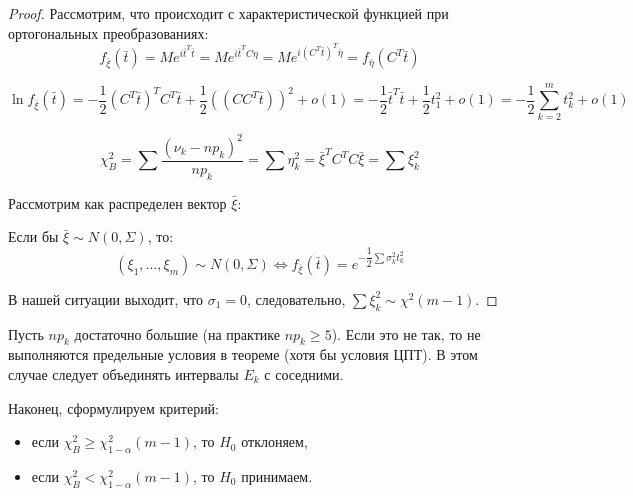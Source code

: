 \begin{proof}
  Рассмотрим, что происходит с характеристической функцией при ортогональных преобразованиях:
  \[
    f_{\bar \xi} (\bar t) = M e^{i \bar t^T \bar t} = M e^{i \bar t^T C \eta} =
    M e^{i (C^T \bar t)^T \bar \eta} = f_{\bar \eta} (C^T \bar t)
  \]

  \[
    \ln f_{\bar \xi} (\bar t) = - \dfrac{1}{2} (C^T \bar t)^T C^T \bar t + \dfrac{1}{2} ((C C^T \bar t))^2 + o(1) = -\dfrac{1}{2} \bar t^T \bar t + \dfrac{1}{2} t_1^2 + o(1) = - \dfrac{1}{2} \sum_{k=2}^m t_k^2 + o(1)
  \]

  \[
    \chi^2_B = \sum \dfrac{(\nu_k - np_k)^2}{np_k} = \sum \eta_k^2 = \bar \xi^T C^T C \bar \xi = \sum \xi_k^2
  \]

  Рассмотрим как распределен вектор $\bar \xi$:
  
  Если бы $\bar \xi \sim N(0, \Sigma)$, то:
  \[
    (\xi_1, \dots, \xi_m) \sim N(0, \Sigma) \Leftrightarrow f_{\bar \xi} (\bar t) = e^{-\dfrac{1}{2} \sum \sigma_k^2 t_k^2}
  \]

  В нашей ситуации выходит, что $\sigma_1 = 0$, следовательно, $\sum \xi_k^2 \sim \chi^2 (m-1)$.
\end{proof}

\begin{remark*} 
  Пусть $np_k$ достаточно большие (на практике $np_k \geqslant
5$). Если это не так, то не выполняются предельные условия в теореме (хотя бы
условия ЦПТ). В этом случае следует объединять интервалы $E_k$ с соседними.
\end{remark*}

Наконец, сформулируем критерий:
\begin{itemize}[label=---]
  \item если $\chi^2_B \geqslant \chi^2_{1-\alpha} (m-1)$, то $H_0$ отклоняем,
  \item если $\chi^2_B < \chi^2_{1-\alpha}(m-1)$, то $H_0$ принимаем.
\end{itemize}

